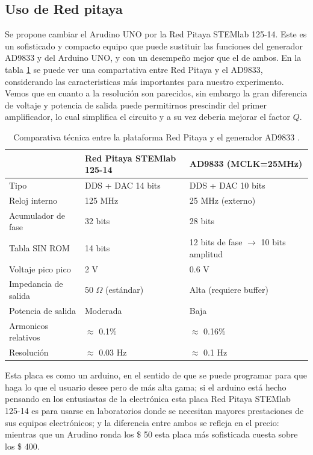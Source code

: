 \subsection{Uso de Red pitaya}
Se propone cambiar el Arudino UNO por la Red Pitaya STEMlab 125-14. Este es un sofisticado y compacto equipo que puede sustituir las funciones del generador AD9833 y del Arduino UNO, y con un desempeño mejor que el de ambos. En la tabla \ref{tab:red-vs-ad9833} se puede ver una compartativa entre Red Pitaya y el AD9833, considerando las caracteristicas más importantes para nuestro experimento. Vemos que en cuanto a la resolución son parecidos, sin embargo la gran diferencia de voltaje y potencia de salida puede permitirnos prescindir del primer amplificador, lo cual simplifica el circuito y a su vez deberia mejorar el factor $Q$. 

\begin{table}[h!]
\centering
\caption{Comparativa técnica entre la plataforma Red Pitaya \cite{redpitaya-datasheet}y el generador AD9833 \cite{ad9833_datasheet}.}
\label{tab:red-vs-ad9833}
\begin{tabular}{@{}lll@{}}
\hline
                    & \textbf{Red Pitaya STEMlab 125-14} & \textbf{AD9833 (MCLK=25MHz)} \\ \midrule
Tipo                & DDS + DAC 14 bits                 & DDS + DAC 10 bits           \\
Reloj interno       & 125 MHz                           & 25 MHz (externo)            \\
Acumulador de fase  & 32 bits                           & 28 bits                     \\
Tabla SIN ROM       & 14 bits                           & 12 bits de fase $\rightarrow$ 10 bits amplitud \\ 
Voltaje pico pico & 2 V & 0.6 V \\
Impedancia de salida & 50 $\Omega$ (estándar) & Alta (requiere buffer) \\
Potencia de salida & Moderada & Baja \\
Armonicos relativos & $\approx$ 0.1\%  & $\approx$ 0.16\% \\
Resolución & $\approx$ 0.03 Hz & $\approx$ 0.1 Hz \\
\hline
\end{tabular}
\end{table}

   
Esta placa es como un arduino, en el sentido de que se puede programar para que haga lo que el usuario desee pero de más alta gama; si el arduino está hecho pensando en los entusiastas de la electrónica esta placa Red Pitaya STEMlab 125-14 es para usarse en laboratorios donde se necesitan mayores prestaciones de sus equipos electrónicos; y la diferencia entre ambos se refleja en el precio: mientras que un Arudino ronda los \$ 50 esta placa más sofisticada cuesta sobre los \$ 400.

